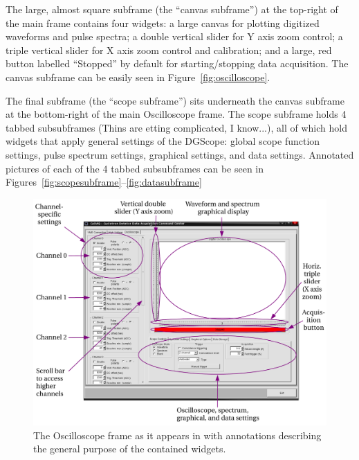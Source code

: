 The large, almost square subframe (the ``canvas subframe'') at the
top-right of the main frame contains four widgets: a large canvas for
plotting digitized waveforms and pulse spectra; a double vertical
slider for Y axis zoom control; a triple vertical slider for X axis
zoom control and calibration; and a large, red button labelled
``Stopped'' by default for starting/stopping data acquisition. The
canvas subframe can be easily seen in Figure~\ref{fig:oscilloscope}.

The final subframe (the ``scope subframe'') sits underneath the canvas
subframe at the bottom-right of the main Oscilloscope frame. The scope
subframe holds 4 tabbed subsubframes (Thins are etting complicated, I
know...), all of which hold widgets that apply general settings of the
DGScope: global scope function settings, pulse spectrum settings,
graphical settings, and data settings. Annotated pictures of each of
the 4 tabbed subsubframes can be seen in
Figures~\ref{fig:scopesubframe}--\ref{fig:datasubframe}

\begin{figure}
  \centering
  \includegraphics[width=6in]{figures/OscilloscopeFrame}
  \caption{The Oscilloscope frame as it appears in
    \ADAQ with annotations describing the general
    purpose of the contained widgets.}
  \label{fig:oscilloscopeframe}
\end{figure}

